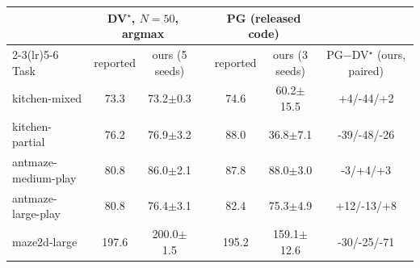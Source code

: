 \begin{tabular}{l cc c cc c}
\toprule
 & \multicolumn{2}{c}{DV$^\star$, $N{=}50$, argmax} & & \multicolumn{2}{c}{PG (released code)} & \\
\cmidrule(lr){2-3}\cmidrule(lr){5-6}
Task & reported & ours (5 seeds) & & reported & ours (3 seeds) & PG$-$DV$^\star$ (ours, paired) \\
\midrule
kitchen-mixed & 73.3 & 73.2{\scriptsize$\pm$0.3} & & 74.6 & 60.2{\scriptsize$\pm$15.5} & +4/-44/+2 \\
kitchen-partial & 76.2 & 76.9{\scriptsize$\pm$3.2} & & 88.0 & 36.8{\scriptsize$\pm$7.1} & -39/-48/-26 \\
antmaze-medium-play & 80.8 & 86.0{\scriptsize$\pm$2.1} & & 87.8 & 88.0{\scriptsize$\pm$3.0} & -3/+4/+3 \\
antmaze-large-play & 80.8 & 76.4{\scriptsize$\pm$3.1} & & 82.4 & 75.3{\scriptsize$\pm$4.9} & +12/-13/+8 \\
maze2d-large & 197.6 & 200.0{\scriptsize$\pm$1.5} & & 195.2 & 159.1{\scriptsize$\pm$12.6} & -30/-25/-71 \\
\bottomrule
\end{tabular}
